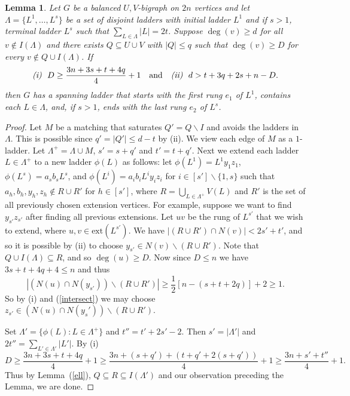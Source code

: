 \documentclass[oneside,12pt]{memoir}
\newtheorem{lemma}[theorem]{Lemma}
\newcommand{\half}{\frac{1}{2}}
\begin{document}
\begin{lemma}\label{elll}
Let $G$ be a balanced $U,V$-bigraph on $2n$ vertices and let $\Lambda=\{L^{1},\dots,L^{s}\}$ be a set of disjoint ladders with initial ladder $L^{1}$ and if $s>1$, terminal ladder $L^s$
such
that $\sum_{L\in \Lambda}|L|=2t$. Suppose $\deg(v)\ge d$ for all $v\notin I(\Lambda)$ and there exists $Q\subseteq U\cup V$ with $|Q|\le q $ such that $\deg(v)\ge D$ for every $v\notin Q\cup I(\Lambda)$. If 
$$\emph{(i)}~~ D\geq\frac{3n+3s+t+4q}{4}+1 ~~\text{ and }~~ \emph{(ii)}~~ d>t+3q+2s+n-D.$$
then $G$ has a spanning ladder that starts
with the first rung $e_{1}$ of $L^{1}$, contains each $L\in \Lambda$, and, if $s>1$, ends with the last rung $e_{2}$ of $L^{s}$.
\end{lemma}
\begin{proof}
Let $M$ be a matching that saturates $Q'=Q\smallsetminus I$ and avoids the ladders in $\Lambda$. This is possible since $q'=|Q'|\le d-t$ by (ii). We view each edge of $M$ as a $1$-ladder. Let $\Lambda^+=\Lambda\cup M$, $s'=s+q'$ and $t'=t+q'$. Next we extend each ladder $L\in \Lambda^+$ to a new ladder $\phi(L)$ as follows: let $\phi(L^1)=L^1y_1z_1$, $\phi(L^s)=a_sb_sL^s$, and $\phi(L^i)=a_ib_iL^iy_iz_i$ for $i\in [s']\smallsetminus\{1,s\}$ such that $a_h,b_h,y_h,z_h \notin R\cup R'$ for $h\in[s']$, where $R= \bigcup_{L\in \Lambda^+}V(L)$ and $R'$ is the set of all previously chosen extension vertices. For example, suppose we want to find $y_{s'}z_{s'}$ after finding all previous extensions. Let $uv$ be the rung of $L^{s'}$ that we wish to extend, where $u,v\in \mathrm{ext}(L^{s'})$. We have $|(R \cup R')\cap N(v)|<2s'+t'$, and so it is possible by (ii) to choose $y_{s'}\in N(v)\smallsetminus(R \cup R')$.  Note that $Q\cup I(\Lambda)\subseteq R$, and so $\deg(u)\ge D$. 
Now since $D\leq n$ we have $3s+t+4q+4\leq n$ and thus 
\begin{equation}
|(N(u)\cap N(y_{s'}))\smallsetminus (R\cup R')|\geq \half[n-(s+t+2q)]+2\geq 1. \label{intersect}
\end{equation}
So by (i) and (\ref{intersect}) we may choose $z_{s'}\in (N(u)\cap N(y_s'))\smallsetminus (R\cup R')$.

Set $\Lambda'=\{\phi(L):L\in \Lambda^+\}$ and $t''=t'+2s'-2$. Then $s'=|\Lambda'|$ and $2t''=\sum_{L'\in \Lambda'}|L'| $. By (i)
$$D \geq\frac{3n+3s+t+4q}{4}+1\geq \frac{3n+(s+q')+(t+q' +2(s+q'))} {4}+1 \geq\frac{3n+s'+t''}{4}+1.$$
Thus by Lemma~(\ref{ell}), $Q\subseteq R\subseteq I(\Lambda')$ and our observation preceding the Lemma, we are done.
\end{proof}
\end{document}
